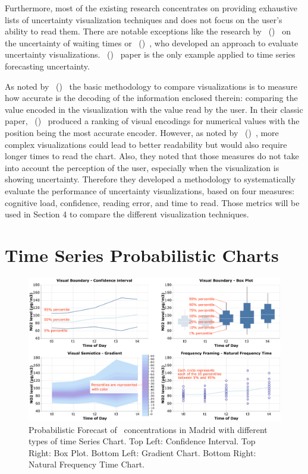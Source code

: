 \documentclass[a4paper,3p,sort&compress]{elsarticle}
\DeclareRobustCommand{\citeextp}[1]{\citeauthor{#1}~(\citeyear{#1})~\cite{#1}}
\begin{document}
Furthermore, most of the existing research concentrates on providing exhaustive
lists of uncertainty visualization techniques and does not focus on the user's
ability to read them. There are notable exceptions like the research by 
\citeextp{2016-when-ish-is-my-bus} on the uncertainty of waiting times or
\citeextp{brennen_instrument_2018}, who developed an approach to
evaluate uncertainty visualizations. \citeextp{leffrang_should_2021}
paper is the only example applied to time series forecasting uncertainty.

As noted by \citeextp{cleveland_graphical_1984} the basic
methodology to compare visualizations is to measure how accurate is the decoding
of the information enclosed therein: comparing the value encoded in the
visualization with the value read by the user. In their classic paper, 
\citeextp{cleveland_graphical_1984} produced a ranking of visual encodings
for numerical values with the position being the most accurate encoder. However,
as noted by \citeextp{brennen_instrument_2018}, more complex
visualizations could lead to better readability but would also require longer
times to read the chart. Also, they noted that those measures do not take into
account the perception of the user, especially when the visualization is showing
uncertainty. Therefore they developed a methodology to systematically evaluate
the performance of uncertainty visualizations, based on four measures: cognitive
load, confidence, reading error, and time to read. Those metrics will be used in
Section 4 to compare the different visualization techniques.

\section{Time Series Probabilistic Charts}
\label{sec:time_series}

\begin{figure}
  \centering
  \includegraphics[width=.9\textwidth]{charts_vector}
  \caption{\label{figure:charts} Probabilistic Forecast of \no~concentrations in Madrid
    with different types of time Series Chart. Top Left: Confidence Interval.
    Top Right: Box Plot. Bottom Left: Gradient Chart. Bottom Right: Natural
    Frequency Time Chart.}
\end{figure}
\end{document}
